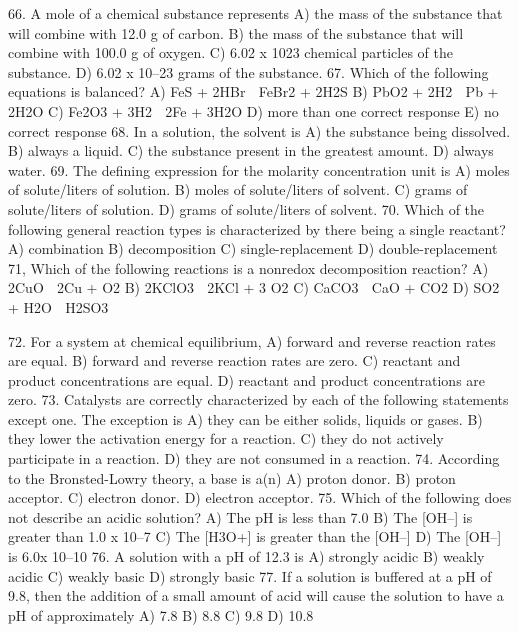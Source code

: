 \documentclass[addpoints, 12pt]{exam}
\begin{document}
\begin{questions}
66.  A mole of a chemical substance represents
A)	the mass of the substance that will combine with 12.0 g of carbon.
B)	the mass of the substance that will combine with 100.0 g of oxygen.
C)	6.02 x 1023 chemical particles of the substance.
D)	6.02 x 10–23 grams of the substance.
67.  Which of the following equations is balanced?
A)	FeS + 2HBr  FeBr2 + 2H2S
B)	PbO2 + 2H2  Pb + 2H2O
C)	Fe2O3 + 3H2  2Fe + 3H2O
D)	more than one correct response
E)	no correct response
68.  In a solution, the solvent is
A)	the substance being dissolved.
B)	always a liquid.
C)	the substance present in the greatest amount.
D)	always water.
69.  The defining expression for the molarity concentration unit is
A)	moles of solute/liters of solution.
B)	moles of solute/liters of solvent.
C)	grams of solute/liters of solution.
D)	grams of solute/liters of solvent.
70.  Which of the following general reaction types is characterized by there being a single reactant?
A)	combination
B)	decomposition
C)	single-replacement
D)	double-replacement
71,  Which of the following reactions is a nonredox decomposition reaction?
A)	2CuO  2Cu + O2
B)	2KClO3  2KCl + 3 O2
C)	CaCO3  CaO + CO2
D)	SO2 + H2O  H2SO3




72.  For a system at chemical equilibrium,
A)	forward and reverse reaction rates are equal.
B)	forward and reverse reaction rates are zero.
C)	reactant and product concentrations are equal.
D)	reactant and product concentrations are zero.
73.  Catalysts are correctly characterized by each of the following statements except one.  The exception is
A)	they can be either solids, liquids or gases.
B)	they lower the activation energy for a reaction.
C)	they do not actively participate in a reaction.
D)	they are not consumed in a reaction.
74.  According to the Bronsted-Lowry theory, a base is a(n)
A)	proton donor.
B)	proton acceptor.
C)	electron donor.
D)	electron acceptor.
75.  Which of the following does not describe an acidic solution?
A)	The pH is less than 7.0
B)	The [OH–] is greater than 1.0 x 10–7
C)	The [H3O+] is greater than the [OH–]
D)	The [OH–] is 6.0x 10–10
76.  A solution with a pH of 12.3 is
A)	strongly acidic
B)	weakly acidic
C)	weakly basic
D)	strongly basic
77.  If a solution is buffered at a pH of 9.8, then the addition of a small amount of acid will cause the solution to have a pH of approximately
A)	7.8
B)	8.8
C)	9.8
D)	10.8






\end{questions}
\end{document}
